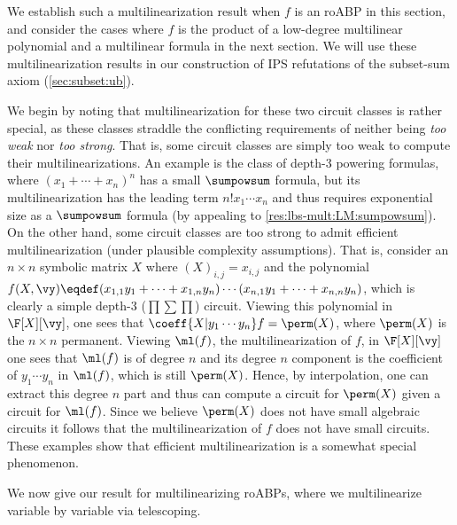 \documentclass[11pt]{article}
\numberwithin{equation}{section}
\theoremstyle{definition}
\theoremstyle{plain}
\begin{document}
We establish such a multilinearization result when $f$ is an roABP in this section, and consider the cases where $f$ is the product of a low-degree multilinear polynomial and a multilinear formula in the next section.  We will use these multilinearization results in our construction of IPS refutations of the subset-sum axiom (\autoref{sec:subset:ub}).

We begin by noting that multilinearization for these two circuit classes is rather special, as these classes straddle the conflicting requirements of neither being \emph{too weak} nor \emph{too strong}.  That is, some circuit classes are simply too weak to compute their multilinearizations.  An example is the class of depth-3 powering formulas, where $(x_1+\cdots+x_n)^n$ has a small $\sumpowsum$ formula, but its multilinearization has the leading term $n!x_1\cdots x_n$ and thus requires exponential size as a $\sumpowsum$ formula (by appealing to \autoref{res:lbs-mult:LM:sumpowsum}). On the other hand, some circuit classes are too strong to admit efficient multilinearization (under plausible complexity assumptions).  That is, consider an $n \times n$ symbolic matrix $X$ where $(X)_{i,j}=x_{i,j}$ and the polynomial $f(X,\vy)\eqdef (x_{1,1} y_1+\cdots +x_{1,n}y_n)\cdots (x_{n,1} y_1+\cdots +x_{n,n}y_n)$, which is clearly a simple depth-3 ($\prod\sum\prod$) circuit.  Viewing this polynomial in $\F[X][\vy]$, one sees that $\coeff{X|y_1\cdots y_n} f=\perm(X)$, where $\perm(X)$ is the $n\times n$ permanent.  Viewing $\ml(f)$, the multilinearization of $f$, in $\F[X][\vy]$ one sees that $\ml(f)$ is of degree $n$ and its degree $n$ component is the coefficient of $y_1\cdots y_n$ in $\ml(f)$, which is still $\perm(X)$.  Hence, by interpolation, one can extract this degree $n$ part and thus can compute a circuit for $\perm(X)$ given a circuit for $\ml(f)$.  Since we believe $\perm(X)$ does not have small algebraic circuits it follows that the multilinearization of $f$ does not have small circuits. These examples show that efficient multilinearization is a somewhat special phenomenon.

We now give our result for multilinearizing roABPs, where we multilinearize variable by variable via telescoping.
\end{document}
